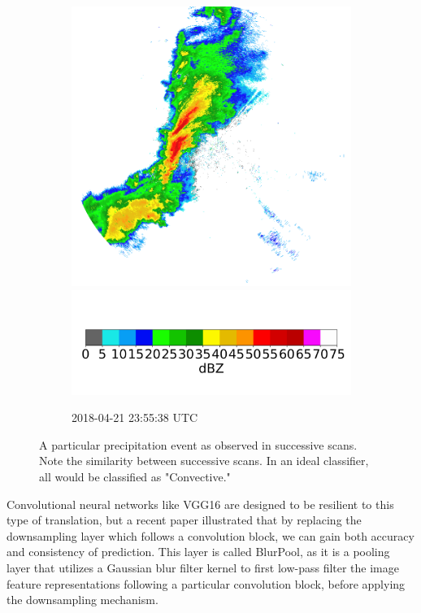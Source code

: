 \begin{figure}[ht]
\begin{subfigure}[b]{0.3\textwidth}
		\includegraphics[width=\textwidth]{./thesis_code/plots/midlothian.tx-20180421-235538-ref.png}
		\includegraphics[width=\textwidth]{./thesis_code/plots/dfw_colormap.png}
		\caption{2018-04-21 23:55:38 UTC}
		\label{fig:bestmodel_translation6}
	\end{subfigure}
	\caption{A particular precipitation event as observed in successive scans. Note the similarity between successive scans. In an ideal classifier, all would be classified as "Convective."}
	\label{fig:bestmodel_translation}
\end{figure}

Convolutional neural networks like VGG16 are designed to be resilient to this type of translation, but a recent paper \cite{zhang2019making} illustrated that by replacing the downsampling layer which follows a convolution block, we can gain both accuracy and consistency of prediction.
This layer is called BlurPool, as it is a pooling layer that utilizes a Gaussian blur filter kernel to first low-pass filter the image feature representations following a particular convolution block, before applying the downsampling mechanism.

